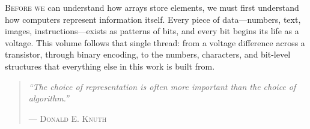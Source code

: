 %
%
%
%

%
\begin{volumeintro}
\lettrine[lines=3]{B}{efore we} can understand how arrays store elements, we must first understand how computers represent information itself. Every piece of data---numbers, text, images, instructions---exists as patterns of bits, and every bit begins its life as a voltage. This volume follows that single thread: from a voltage difference across a transistor, through binary encoding, to the numbers, characters, and bit-level structures that everything else in this work is built from.

\begin{quote}
\textit{``The choice of representation is often more important than the choice of algorithm.''}

\hfill--- \textsc{Donald E. Knuth}
\end{quote}
\end{volumeintro}

